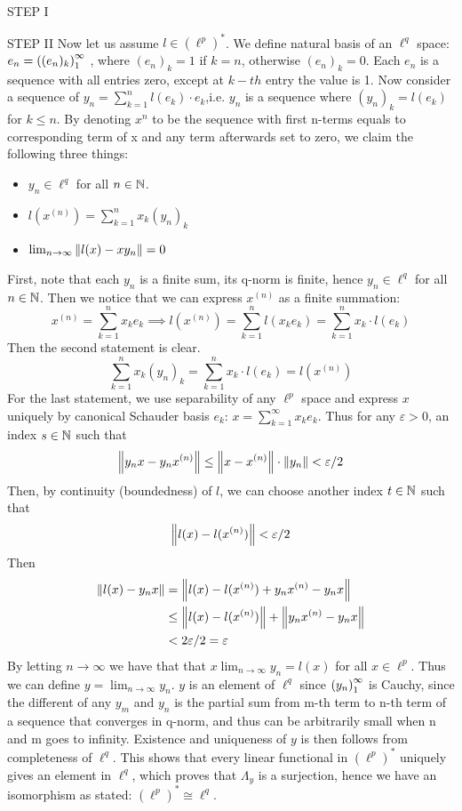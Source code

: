 \begin{theorem}
\begin{pf}{STEP I}{}
\end{pf}
\begin{pf}{STEP II}{}
	Now let us assume $l\in(\ell^p)^*$. We define natural basis of an $\ell^q$ space: $e_n=\left({(e_n)_k}\right)_1^\infty$ , where $(e_n)_k=1$ if $k=n$, otherwise $(e_n)_k=0$. Each $e_n$ is a sequence with all entries zero, except at $k-th$ entry the value is 1. Now consider a sequence of $y_n=\sum_{k=1}^nl(e_k)\cdot e_k$,i.e. $y_n$ is a sequence where $(y_n)_k=l(e_k)$ for $k\leq n$. By denoting $x^n$ to be the sequence with first n-terms equals to corresponding term of x and any term afterwards set to zero, we claim the following three things:
	\begin{itemize}
		\item $y_n\in\ell^q$ for all $n\in\mathbb{N}$. 
		\item $l(x^{(n)})=\sum_{k=1}^nx_k(y_n)_k$
		\item $\lim_{n\to\infty}\left\|{l(x)-xy_n}\right\|=0$
	\end{itemize}
	First, note that each $y_n$ is a finite sum, its q-norm is finite, hence $y_n\in\ell^q$ for all $n\in\mathbb{N}$.  Then we notice that we can express $x^(n)$ as a finite summation:
	$$
	x^{(n)}=\sum_{k=1}^nx_ke_k\implies l(x^{(n)})=\sum_{k=1}^nl(x_ke_k)=\sum_{k=1}^nx_k\cdot l(e_k)
	$$
	Then the second statement is clear.
	$$
	\sum_{k=1}^nx_k(y_n)_k=\sum_{k=1}^nx_k\cdot l(e_k)=l(x^{(n)})
	$$
	For the last statement, we use separability of any $\ell^p$ space and express $x$ uniquely by canonical Schauder basis $e_k$: $x=\sum_{k=1}^\infty x_ke_k$. Thus for any $\varepsilon>0$, an index $s\in\mathbb{N}$ such that 
	$$
	\left\|{y_nx-y_nx^{(n)}}\right\|\leq
	\left\|{x-x^{(n)}}\right\|\cdot\left\|{y_n}\right\|
	<\varepsilon/2
	$$
	Then, by continuity (boundedness) of $l$, we can choose another index $t\in\mathbb{N}$ such that 
	$$
	\left\|{l(x)-l(x^{(n)})}\right\|<\varepsilon/2
	$$
	Then 
	\begin{equation}
		\begin{split}
			\left\|{l(x)-y_nx}\right\|&=\left\|{l(x)-l(x^{(n)})+y_nx^{(n)}-y_nx}\right\|\\
			&\leq\left\|{l(x)-l(x^{(n)})}\right\|+\left\|{y_nx^{(n)}-y_nx}\right\|\\
			&<2\varepsilon/2=\varepsilon
		\end{split}
	\end{equation}
	By letting $n\to\infty$ we have that that $x\lim_{n\to\infty}y_n=l(x)$ for all $x\in\ell^p$. Thus we can define $y=\lim_{n\to\infty}y_n$. $y$ is an element of $\ell^q$ since $\left({y_n}\right)_1^\infty$ is Cauchy, since the different of any $y_m$ and $y_n$ is the partial sum from m-th term to n-th term of a sequence that converges in q-norm, and thus can be arbitrarily small when n and m goes to infinity. Existence and uniqueness of $y$ is then follows from completeness of $\ell^q$. This shows that every linear functional in $(\ell^p)^*$ uniquely gives an element in $\ell^q$, which proves that $\Lambda_y$ is a surjection, hence we have an isomorphism as stated: $(\ell^p)^*\cong\ell^q$.
\end{pf}
\end{theorem}

